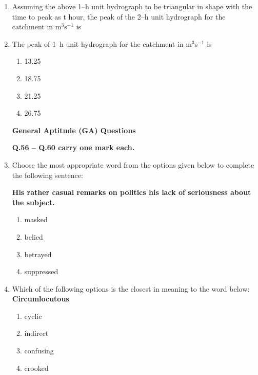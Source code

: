 \documentclass[journal]{IEEEtran}
\numberwithin{equation}{enumi}
\numberwithin{figure}{enumi}
\begin{document}
\begin{enumerate}
    \item Assuming the above 1--h unit hydrograph to be triangular in shape with the time to peak as t hour, the peak of the 2--h unit hydrograph for the catchment in m$^3$s$^{-1}$ is
   \item The peak of 1--h unit hydrograph for the catchment in m$^3$s$^{-1}$ is
    \hfill{}
\begin{multicols}{4}
    \begin{enumerate}
    \item  13.25 
    \item 18.75
    \item 21.25
    \item 26.75
    \end{enumerate}
    \end{multicols}    





\large{\textbf{General Aptitude (GA) Questions}}

\textbf{Q.56 -- Q.60 carry one mark each.}
\vspace{0.25cm}

\item Choose the most appropriate word from the options given below to complete the following sentence:

\textbf{His rather casual remarks on politics \underline{\hspace{2cm}} his lack of seriousness about the subject.}
 \hfill{}
    \begin{enumerate}
     \item masked
    \item belied
    \item betrayed
    \item suppressed
\end{enumerate}



\item Which of the following options is the closest in meaning to the word below:\\
\textbf{Circumlocutous}
\hfill{}
    \begin{enumerate}
     \item cyclic
    \item indirect
    \item confusing
    \item crooked
    \end{enumerate}




\end{enumerate}
\end{document}
